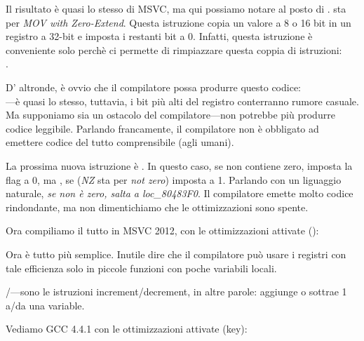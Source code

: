 \label{movzx}

Il risultato è quasi lo stesso di MSVC, ma qui possiamo notare \MOVZX al posto di \MOVSX. 
\MOVZX sta per \emph{MOV with Zero-Extend}. 
Questa istruzione copia un valore a 8 o 16 bit in un registro a 32-bit e imposta i restanti bit a 0. 
Infatti, questa istruzione è conveniente solo perchè ci permette di rimpiazzare questa coppia di istruzioni:\\
.

D' altronde, è ovvio che il compilatore possa produrre questo codice:\\
---è quasi lo stesso, tuttavia, 
i bit più alti del registro \EAX conterranno rumore casuale. 
Ma supponiamo sia un ostacolo del compilatore---non potrebbe più produrre codice leggibile. 
Parlando francamente, il compilatore non è obbligato ad emettere codice del tutto comprensibile (agli umani).


La prossima nuova istruzione è \SETNZ. 
In questo caso, se \AL non contiene zero,  
imposta la flag \ZF a 0, ma \SETNZ, se  (\emph{NZ} sta per \emph{not zero}) imposta \AL a 1.
Parlando con un liguaggio naturale, \emph{se \AL non è zero, salta a loc\_80483F0}. 
Il compilatore emette molto codice rindondante, ma non dimentichiamo che le ottimizzazioni sono spente.

\label{strlen_MSVC_Ox}

Ora compiliamo il tutto in MSVC 2012, con le ottimizzazioni attivate (\Ox):



Ora è tutto più semplice.
Inutile dire che il compilatore può usare i registri con tale efficienza 
solo in piccole funzioni con poche variabili locali.

\INC/\DEC---sono le istruzioni \gls{increment}/\gls{decrement}, in altre parole: aggiunge o sottrae 1 a/da una variable.




Vediamo GCC 4.4.1 con le ottimizzazioni attivate (\Othree key):

